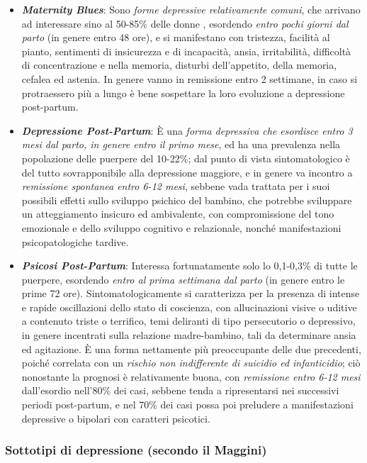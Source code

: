 \begin{itemize}
\item
  \textbf{\emph{Maternity Blues}}: Sono \emph{forme depressive
  relativamente comuni}, che arrivano ad interessare sino al 50-85\%
  delle donne , esordendo \emph{entro pochi giorni dal parto} (in genere
  entro 48 ore), e si manifestano con tristezza, facilità al pianto,
  sentimenti di insicurezza e di incapacità, ansia, irritabilità,
  difficoltà di concentrazione e nella memoria, disturbi dell'appetito,
  della memoria, cefalea ed astenia. In genere vanno in remissione entro
  2 settimane, in caso si protraessero più a lungo è bene sospettare la
  loro evoluzione a depressione post-partum.
\item
  \textbf{\emph{Depressione Post-Partum}}: È una \emph{forma depressiva
  che esordisce entro 3 mesi dal parto, in genere entro il primo mese},
  ed ha una prevalenza nella popolazione delle puerpere del 10-22\%; dal
  punto di vista sintomatologico è del tutto sovrapponibile alla
  depressione maggiore, e in genere va incontro a \emph{remissione
  spontanea entro 6-12 mesi}, sebbene vada trattata per i suoi possibili
  effetti sullo sviluppo psichico del bambino, che potrebbe sviluppare
  un atteggiamento insicuro ed ambivalente, con compromissione del tono
  emozionale e dello sviluppo cognitivo e relazionale, nonché
  manifestazioni psicopatologiche tardive.
\item
  \textbf{\emph{Psicosi Post-Partum}}: Interessa fortunatamente solo lo
  0,1-0,3\% di tutte le puerpere, esordendo \emph{entro al prima
  settimana dal parto} (in genere entro le prime 72 ore).
  Sintomatologicamente si caratterizza per la presenza di intense e
  rapide oscillazioni dello stato di coscienza, con allucinazioni visive
  o uditive a contenuto triste o terrifico, temi deliranti di tipo
  persecutorio o depressivo, in genere incentrati sulla relazione
  madre-bambino, tali da determinare ansia ed agitazione. È una forma
  nettamente più preoccupante delle due precedenti, poiché correlata con
  un \emph{rischio non indifferente di suicidio ed infanticidio}; ciò
  nonostante la prognosi è relativamente buona, con \emph{remissione
  entro 6-12 mesi} dall'esordio nell'80\% dei casi, sebbene tenda a
  ripresentarsi nei successivi periodi post-partum, e nel 70\% dei casi
  possa poi preludere a manifestazioni depressive o bipolari con
  caratteri psicotici.
\end{itemize}

\subsubsection{Sottotipi di depressione (secondo il Maggini)}

